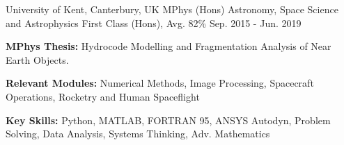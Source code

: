 \begin{cventries}

  \cventry
    {University of Kent, Canterbury, UK} %
    {MPhys (Hons) Astronomy, Space Science and Astrophysics} %
    {First Class (Hons), Avg. 82\%} %
    {Sep. 2015 - Jun. 2019} %
    {
      \begin{cvitems} %
         \item {\textbf{MPhys Thesis:} Hydrocode Modelling and Fragmentation Analysis of Near Earth Objects.}
         \item {\textbf{Relevant Modules:} Numerical Methods, Image Processing, Spacecraft Operations, Rocketry and Human Spaceflight}
         \item {\textbf{Key Skills:} Python, MATLAB, FORTRAN 95, ANSYS Autodyn, Problem Solving, Data Analysis, Systems Thinking, Adv. Mathematics}
      \end{cvitems}
    }
    
\end{cventries}

